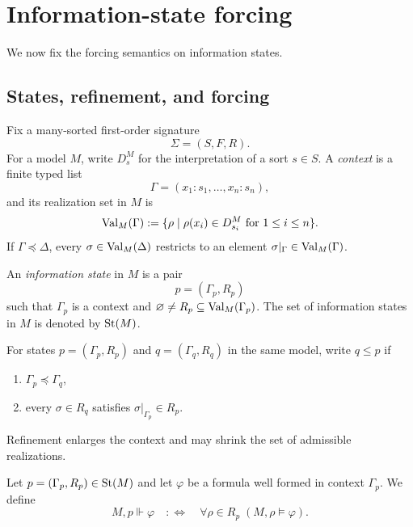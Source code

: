 \section{Information-state forcing}\label{sec:information-states}

We now fix the forcing semantics on information states.

\subsection{States, refinement, and forcing}

Fix a many-sorted first-order signature
\[
\Sigma=(S,F,R).
\]
For a model $M$, write $D_s^M$ for the interpretation of a sort $s\in S$. A \emph{context} is a finite typed list
\[
\Gamma=(x_1:s_1,\dots,x_n:s_n),
\]
and its realization set in $M$ is
\[
\mathrm{Val}_M(\Gamma):=\{\rho\mid \rho(x_i)\in D_{s_i}^M\text{ for }1\le i\le n\}.
\]
If $\Gamma\preceq\Delta$, every $\sigma\in\mathrm{Val}_M(\Delta)$ restricts to an element $\sigma|_{\Gamma}\in\mathrm{Val}_M(\Gamma)$.

\begin{definition}\label{def:information-state}
An \emph{information state} in $M$ is a pair
\[
p=(\Gamma_p,R_p)
\]
such that $\Gamma_p$ is a context and $\varnothing\neq R_p\subseteq \mathrm{Val}_M(\Gamma_p)$. The set of information states in $M$ is denoted by $\mathrm{St}(M)$.
\end{definition}

\begin{definition}[Refinement]\label{def:refinement}
For states $p=(\Gamma_p,R_p)$ and $q=(\Gamma_q,R_q)$ in the same model, write $q\le p$ if
\begin{enumerate}[label=(\roman*),nosep]
\item $\Gamma_p\preceq\Gamma_q$,
\item every $\sigma\in R_q$ satisfies $\sigma|_{\Gamma_p}\in R_p$.
\end{enumerate}
\end{definition}

Refinement enlarges the context and may shrink the set of admissible realizations.

\begin{definition}\label{def:state-forcing}
Let $p=(\Gamma_p,R_p)\in\mathrm{St}(M)$ and let $\varphi$ be a formula well formed in context $\Gamma_p$. We define
\[
M,p\Vdash\varphi
\quad:\Longleftrightarrow\quad
\forall \rho\in R_p\;(M,\rho\models\varphi).
\]
\end{definition}

